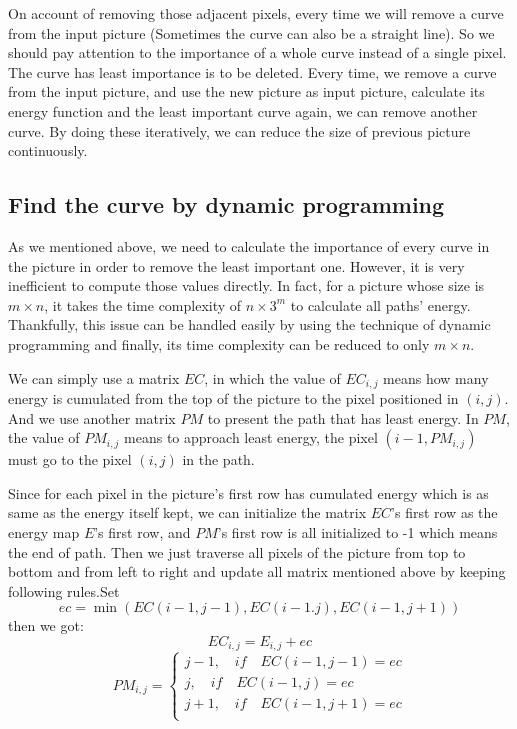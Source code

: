 \documentclass[final]{cvpr}
\begin{document}
On account of removing those adjacent pixels, every time we will remove a curve from the input picture (Sometimes the curve can also be a straight line). So we should pay attention to the importance of a whole curve instead of a single pixel. The curve has least importance is to be deleted. Every time, we remove a curve from the input picture, and use the new picture as input picture, calculate its energy function and the least important curve again, we can remove another curve. By doing these iteratively, we can reduce the size of previous picture continuously.

\subsection{Find the curve by dynamic programming}
As we mentioned above, we need to calculate the importance of every curve in the picture in order to remove the least important one. However, it is very inefficient to compute those values directly. In fact, for a picture whose size is $m\times n$, it takes the time complexity of $n\times 3^m$ to calculate all paths' energy. Thankfully, this issue can be handled easily by using the technique of dynamic programming and finally, its time complexity can be reduced to only $m\times n$.

We can simply use a matrix $EC$, in which the value of $EC_{i,j}$ means how many energy is cumulated from the top of the picture to the pixel positioned in $(i,j)$. And we use another matrix $PM$ to present the path that has least energy. In $PM$, the value of $PM_{i,j}$ means to approach least energy, the pixel $(i-1, PM_{i,j})$ must go to the pixel $(i,j)$ in the path.

Since for each pixel in the picture's first row has cumulated energy which is as same as the energy itself kept, we can initialize the matrix $EC$'s first row as the energy map $E$'s first row, and $PM$'s first row is all initialized to -1 which means the end of path. Then we just traverse all pixels of the picture from top to bottom and from left to right and update all matrix mentioned above by keeping following rules.Set 
$$ec = \min({EC(i-1,j-1),EC(i-1.j),EC(i-1,j+1)})$$
then we got:
$$
EC_{i,j}=E_{i,j}+ec
$$
$$
PM_{i,j}=
\left\{\begin{matrix}{}
j-1,\quad if \quad EC(i-1,j-1)=ec\\
j,\quad if \quad EC(i-1,j)=ec\\
j+1,\quad if \quad EC(i-1,j+1)=ec\\
\end{matrix}\right.
$$
\end{document}

